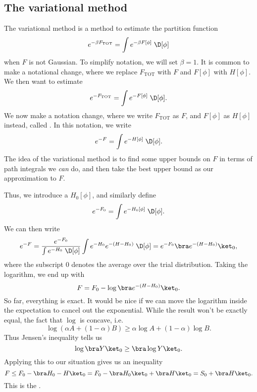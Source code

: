 \documentclass[a4paper]{article}
\begin{document}
\subsection{The variational method}
The variational method is a method to estimate the partition function
\[
  e^{-\beta F_{\mathrm{TOT}}} = \int e^{-\beta F[\phi]} \;\D [\phi]
\]
when $F$ is not Gaussian. To simplify notation, we will set $\beta = 1$. It is common to make a notational change, where we replace $F_{\mathrm{TOT}}$ with $F$ and $F[\phi]$ with $H[\phi]$. We then want to estimate
\[
  e^{-F_{\mathrm{TOT}}} = \int e^{-F[\phi]}\;\D [\phi].
\]
We now make a notation change, where we write $F_{\mathrm{TOT}}$ as $F$, and $F[\phi]$ as $H[\phi]$ instead, called . In this notation, we write
\[
  e^{-F} = \int e^{-H[\phi]} \;\D [\phi].
\]
The idea of the variational method is to find some upper bounds on $F$ in terms of path integrals we \emph{can} do, and then take the best upper bound as our approximation to $F$.

Thus, we introduce a  $H_0[\phi]$, and similarly define
\[
  e^{-F_0} = \int e^{-H_0[\phi]} \;\D [\phi].
\]
We can then write
\[
  e^{-F} = \frac{e^{-F_0}}{\int e^{-H_0}\;\D [\phi]} \int e^{-H_0} e^{-(H - H_0)}\;\D [\phi] = e^{-F_0} \bra e^{-(H - H_0)} \ket_0,
\]
where the subscript $0$ denotes the average over the trial distribution. Taking the logarithm, we end up with
\[
  F = F_0 - \log \bra e^{-(H - H_0)}\ket_0.
\]
So far, everything is exact. It would be nice if we can move the logarithm inside the expectation to cancel out the exponential. While the result won't be exactly equal, the fact that $\log$ is concave, i.e.
\[
  \log (\alpha A + (1 - \alpha) B) \geq \alpha \log A + (1 - \alpha) \log B.
\]
Thus Jensen's inequality tells us
\[
  \log \bra Y \ket_0 \geq \bra \log Y \ket_0.
\]
Applying this to our situation gives us an inequality
\[
  F \leq F_0 - \bra H_0 - H\ket_0 = F_0 - \bra H_0\ket_0 + \bra H\ket_0 = S_0 + \bra H\ket_0.
\]
This is the .
\end{document}
